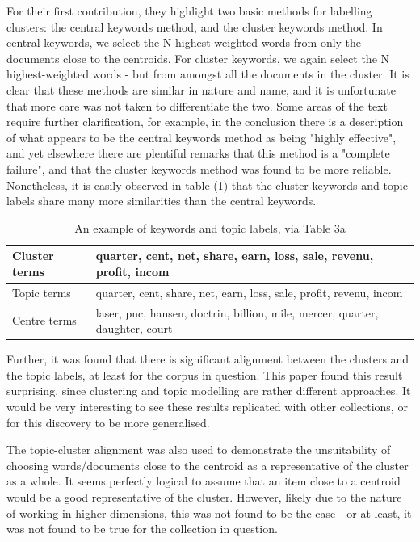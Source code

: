 \documentclass[sigconf,authorversion,nonacm]{acmart}
\begin{document}
For their first contribution, they highlight two basic methods for labelling clusters: the central keywords method, and
the cluster keywords method. In central keywords, we select the N highest-weighted words from only the documents close
to the centroids. For cluster keywords, we again select the N highest-weighted words - but from amongst all the
documents in the cluster. It is clear that these methods are similar in nature and name, and it is unfortunate that more
care was not taken to differentiate the two. Some areas of the text require further clarification, for example, in the
conclusion there is a description of what appears to be the central keywords method as being "highly
effective"\cite{Yuan2021}, and yet elsewhere there are plentiful remarks that this method is a "complete
failure"\cite{Yuan2021}, and that the cluster keywords method was found to be more reliable. Nonetheless, it is easily
observed in table (1) that the cluster keywords and topic labels share many more similarities than the central keywords.
\begin{table}[] \begin{tabular}{lp{5cm}} \hline Cluster terms & quarter, cent, net, share, earn, loss, sale, revenu,
profit, incom \\ \hline Topic terms  & quarter, cent, share, net, earn, loss, sale, profit, revenu, incom\\ \hline
Centre terms & laser, pnc, hansen, doctrin, billion, mile, mercer, quarter, daughter, court\\ \hline \end{tabular}
\caption{An example of keywords and topic labels, via Table 3a \cite{Yuan2021}} \end{table} Further, it was found that
there is significant alignment between the clusters and the topic labels, at least for the corpus in question. This
paper found this result surprising, since clustering and topic modelling are rather different approaches. It would be
very interesting to see these results replicated with other collections, or for this discovery to be more generalised.

The topic-cluster alignment was also used to demonstrate the unsuitability of choosing words/documents close to the
centroid as a representative of the cluster as a whole. It seems perfectly logical to assume that an item close to a
centroid would be a good representative of the cluster. However,  likely due to the nature of working in higher
dimensions, this was not found to be the case - or at least, it was not found to be true for the collection in question.
\end{document}
